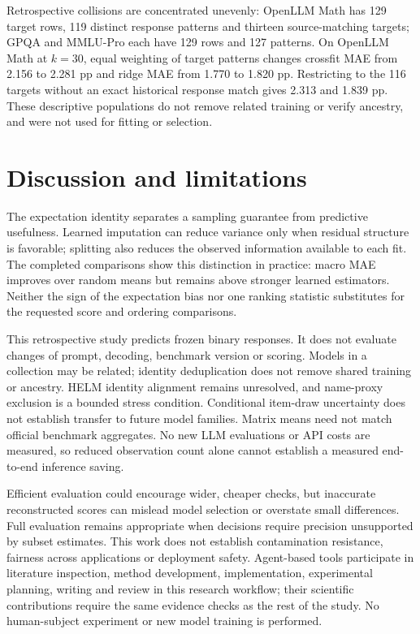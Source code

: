 \documentclass{article}
\begin{document}
Retrospective collisions are concentrated unevenly: OpenLLM Math has 129 target rows, 119 distinct response patterns and thirteen source-matching targets; GPQA and MMLU-Pro each have 129 rows and 127 patterns. On OpenLLM Math at $k=30$, equal weighting of target patterns changes crossfit MAE from 2.156 to 2.281 pp and ridge MAE from 1.770 to 1.820 pp. Restricting to the 116 targets without an exact historical response match gives 2.313 and 1.839 pp. These descriptive populations do not remove related training or verify ancestry, and were not used for fitting or selection.


\section{Discussion and limitations}\label{sec:limits}
The expectation identity separates a sampling guarantee from predictive usefulness. Learned imputation can reduce variance only when residual structure is favorable; splitting also reduces the observed information available to each fit. The completed comparisons show this distinction in practice: macro MAE improves over random means but remains above stronger learned estimators. Neither the sign of the expectation bias nor one ranking statistic substitutes for the requested score and ordering comparisons.

This retrospective study predicts frozen binary responses. It does not evaluate changes of prompt, decoding, benchmark version or scoring. Models in a collection may be related; identity deduplication does not remove shared training or ancestry. HELM identity alignment remains unresolved, and name-proxy exclusion is a bounded stress condition. Conditional item-draw uncertainty does not establish transfer to future model families. Matrix means need not match official benchmark aggregates. No new LLM evaluations or API costs are measured, so reduced observation count alone cannot establish a measured end-to-end inference saving.

Efficient evaluation could encourage wider, cheaper checks, but inaccurate reconstructed scores can mislead model selection or overstate small differences. Full evaluation remains appropriate when decisions require precision unsupported by subset estimates. This work does not establish contamination resistance, fairness across applications or deployment safety. Agent-based tools participate in literature inspection, method development, implementation, experimental planning, writing and review in this research workflow; their scientific contributions require the same evidence checks as the rest of the study. No human-subject experiment or new model training is performed.
\end{document}
